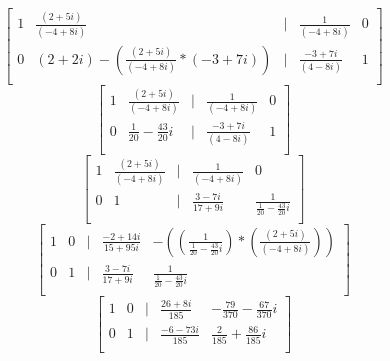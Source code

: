 \documentclass{article}
\begin{document}
            \[
                \begin{bmatrix}
                    1 & \frac{(2 + 5 i)}{(-4 + 8 i)} & | & \frac{1}{(-4 + 8 i)} & 0\\
                    0 & (2 + 2 i) - (\frac{(2 + 5 i)}{(-4 + 8 i)} * (-3 + 7 i)) & | & \frac{-3 + 7 i}{(4 - 8 i)} & 1\\
                \end{bmatrix}
            \]
            \[
                \begin{bmatrix}
                    1 & \frac{(2 + 5 i)}{(-4 + 8 i)} & | & \frac{1}{(-4 + 8 i)} & 0\\
                    0 & \frac{1}{20} - \frac{43}{20}i & | & \frac{-3 + 7 i}{(4 - 8 i)} & 1\\
                \end{bmatrix}
            \]
            \[
                \begin{bmatrix}
                    1 & \frac{(2 + 5 i)}{(-4 + 8 i)} & | & \frac{1}{(-4 + 8 i)} & 0\\
                    0 & 1 & | & \frac{3-7i}{17+9i} & \frac{1}{\frac{1}{20} - \frac{43}{20}i}\\
                \end{bmatrix}
            \]
            \[
                \begin{bmatrix}
                    1 & 0 & | & \frac{-2+14i}{15+95i} & -((\frac{1}{\frac{1}{20} - \frac{43}{20}i})*(\frac{(2 + 5 i)}{(-4 + 8 i)}))\\
                    0 & 1 & | & \frac{3-7i}{17+9i} & \frac{1}{\frac{1}{20} - \frac{43}{20}i}\\
                \end{bmatrix}
            \]
            \[
                \begin{bmatrix}
                    1 & 0 & | & \frac{26+8i}{185} & -\frac{79}{370} - \frac{67}{370}i\\
                    0 & 1 & | & \frac{-6-73i}{185} & \frac{2}{185} + \frac{86}{185}i\\
                \end{bmatrix}
            \]
\end{document}
